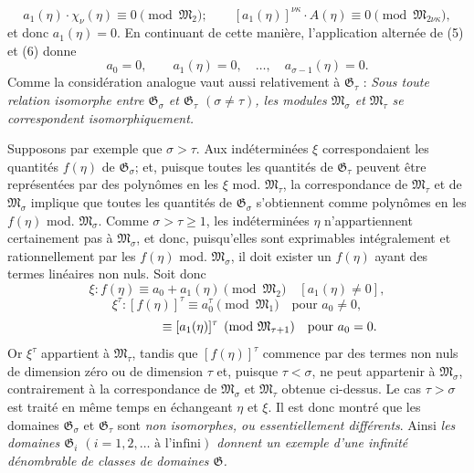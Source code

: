\[
 a_1(\eta)\cdot\chi_\nu(\eta)\equiv0\pmod{\mathfrak M_2};\qquad
 [a_1(\eta)]^{\nu\kappa}\cdot A(\eta)\equiv0\pmod{\mathfrak M_{2\nu\kappa}},
\]
et donc $a_1(\eta)=0$. En continuant de cette manière, l'application alternée de (5) et (6) donne
\[
 a_0=0,\qquad a_1(\eta)=0,\quad \ldots,\quad a_{\sigma-1}(\eta)=0.
\]
Comme la considération analogue vaut aussi relativement à $\mathfrak G_\tau$ : \emph{Sous toute relation isomorphe entre $\mathfrak G_\sigma$ et $\mathfrak G_\tau$ $(\sigma\ne\tau)$, les modules $\mathfrak M_\sigma$ et $\mathfrak M_\tau$ se correspondent isomorphiquement.}

Supposons par exemple que $\sigma>\tau$. Aux indéterminées $\xi$ correspondaient les quantités $f(\eta)$ de $\mathfrak G_\sigma$; et, puisque toutes les quantités de $\mathfrak G_\tau$ peuvent être représentées par des polynômes en les $\xi$ mod. $\mathfrak M_\tau$, la correspondance de $\mathfrak M_\tau$ et de $\mathfrak M_\sigma$ implique que toutes les quantités de $\mathfrak G_\sigma$ s'obtiennent comme polynômes en les $f(\eta)$ mod. $\mathfrak M_\sigma$. Comme $\sigma>\tau\ge1$, les indéterminées $\eta$ n'appartiennent certainement pas à $\mathfrak M_\sigma$, et donc, puisqu'elles sont exprimables intégralement et rationnellement par les $f(\eta)$ mod. $\mathfrak M_\sigma$, il doit exister un $f(\eta)$ ayant des termes linéaires non nuls. Soit donc
\[
 \xi:f(\eta)\equiv a_0+a_1(\eta)\pmod{\mathfrak M_2}\quad[a_1(\eta)\ne0],
\]
\[
 \xi^\tau:[f(\eta)]^\tau\equiv a_0^\tau\pmod{\mathfrak M_1}\quad\text{pour }a_0\ne0,
\]
\[
 \hphantom{\xi^\tau:[f(\eta)]^\tau}\equiv [a_1(\eta)]^\tau
 \pmod{\mathfrak M_{\tau+1}}\quad\text{pour }a_0=0.
\]
Or $\xi^\tau$ appartient à $\mathfrak M_\tau$, tandis que $[f(\eta)]^\tau$ commence par des termes non nuls de dimension zéro ou de dimension $\tau$ et, puisque $\tau<\sigma$, ne peut appartenir à $\mathfrak M_\sigma$, contrairement à la correspondance de $\mathfrak M_\sigma$ et $\mathfrak M_\tau$ obtenue ci-dessus. Le cas $\tau>\sigma$ est traité en même temps en échangeant $\eta$ et $\xi$. Il est donc montré que les domaines $\mathfrak G_\sigma$ et $\mathfrak G_\tau$ sont \emph{non isomorphes, ou essentiellement différents}. Ainsi \emph{les domaines $\mathfrak G_i$ $(i=1,2,\ldots\text{ à l'infini})$ donnent un exemple d'une infinité dénombrable de classes de domaines $\mathfrak G$.}

